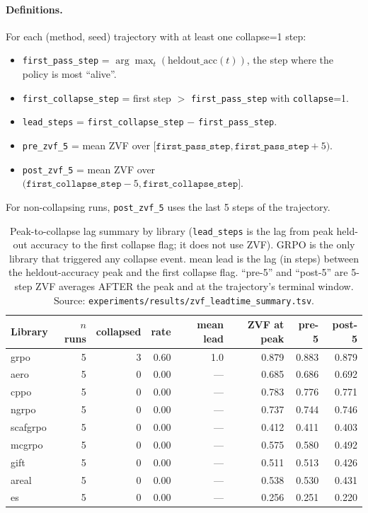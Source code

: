 \paragraph{Definitions.}
For each (method, seed) trajectory with at least one collapse=1 step:
\begin{itemize}
\item \texttt{first\_pass\_step} = $\arg\max_{t}(\text{heldout\_acc}(t))$,
the step where the policy is most ``alive''.
\item \texttt{first\_collapse\_step} = first step $> $ \texttt{first\_pass\_step} with \texttt{collapse}=1.
\item \texttt{lead\_steps} = \texttt{first\_collapse\_step} $-$ \texttt{first\_pass\_step}.
\item \texttt{pre\_zvf\_5} = mean ZVF over $[\texttt{first\_pass\_step}, \texttt{first\_pass\_step}+5)$.
\item \texttt{post\_zvf\_5} = mean ZVF over $(\texttt{first\_collapse\_step}-5, \texttt{first\_collapse\_step}]$.
\end{itemize}
For non-collapsing runs, \texttt{post\_zvf\_5} uses the last 5 steps of
the trajectory.

\begin{table}[htbp]
\centering
\small
\begin{tabular}{lrrrrrrr}
\toprule
Library & $n$ runs & collapsed & rate & mean lead & ZVF at peak & pre-5 & post-5 \\
\midrule
grpo       & 5 & 3 & 0.60 & 1.0  & 0.879 & 0.883 & 0.879 \\
aero       & 5 & 0 & 0.00 & ---  & 0.685 & 0.686 & 0.692 \\
cppo       & 5 & 0 & 0.00 & ---  & 0.783 & 0.776 & 0.771 \\
ngrpo      & 5 & 0 & 0.00 & ---  & 0.737 & 0.744 & 0.746 \\
scafgrpo   & 5 & 0 & 0.00 & ---  & 0.412 & 0.411 & 0.403 \\
mcgrpo     & 5 & 0 & 0.00 & ---  & 0.575 & 0.580 & 0.492 \\
gift       & 5 & 0 & 0.00 & ---  & 0.511 & 0.513 & 0.426 \\
areal      & 5 & 0 & 0.00 & ---  & 0.538 & 0.530 & 0.431 \\
es         & 5 & 0 & 0.00 & ---  & 0.256 & 0.251 & 0.220 \\
\bottomrule
\end{tabular}
\caption{Peak-to-collapse lag summary by library (\texttt{lead\_steps} is the lag from peak held-out accuracy to the first collapse flag; it does not use ZVF). GRPO is the only library
that triggered any collapse event. mean lead is the lag (in steps)
between the heldout-accuracy peak and the first collapse flag.
``pre-5'' and ``post-5'' are 5-step ZVF averages AFTER the peak and
at the trajectory's terminal window. Source:
\texttt{experiments/results/zvf\_leadtime\_summary.tsv}.}
\label{tab:zvf-leadtime}
\end{table}

